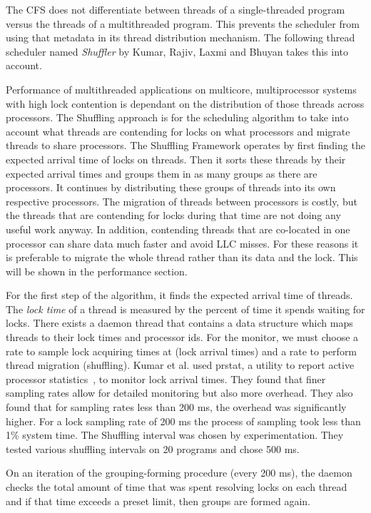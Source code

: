 \documentclass{sig-alternate}
\begin{document}
The CFS does not differentiate between threads of a single-threaded program versus the threads of a multithreaded program. This prevents the scheduler from using that metadata in its thread distribution mechanism. The following thread scheduler named \emph{Shuffler} by Kumar, Rajiv, Laxmi and Bhuyan takes this into account.~\cite{KumarEtal:2014}

Performance of multithreaded applications on multicore, multiprocessor systems with high lock contention is dependant on the distribution of those threads across processors. The Shuffling approach is for the scheduling algorithm to take into account what threads are contending for locks on what processors and migrate threads to share processors. The Shuffling Framework operates by first finding the expected arrival time of locks on threads. Then it sorts these threads by their expected arrival times and groups them in as many groups as there are processors. It continues by distributing these groups of threads into its own respective processors. The migration of threads between processors is costly, but the threads that are contending for locks during that time are not doing any useful work anyway. In addition, contending threads that are co-located in one processor can share data much faster and avoid LLC misses. For these reasons it is preferable to migrate the whole thread rather than its data and the lock. This will be shown in the performance section.~\cite{KumarEtal:2014}

For the first step of the algorithm, it finds the expected arrival time of threads. The \textit{lock time} of a thread is measured by the percent of time it spends waiting for locks. There exists a daemon thread that contains a data structure which maps threads to their lock times and processor ids. For the monitor, we must choose a rate to sample lock acquiring times at (lock arrival times) and a rate to perform thread migration (shuffling). Kumar et al. used prstat, a utility to report active processor statistics~\cite{prstat}, to monitor lock arrival times. They found that finer sampling rates allow for detailed monitoring but also more overhead. They also found that for sampling rates less than 200 ms, the overhead was significantly higher. For a lock sampling rate of 200 ms the process of sampling took less than 1\% system time. The Shuffling interval was chosen by experimentation. They tested various shuffling intervals on 20 programs and chose 500 ms.

On an iteration of the grouping-forming procedure (every 200 ms), the daemon checks the total amount of time that was spent resolving locks on each thread and if that time exceeds a preset limit, then groups are formed again.
\end{document}
